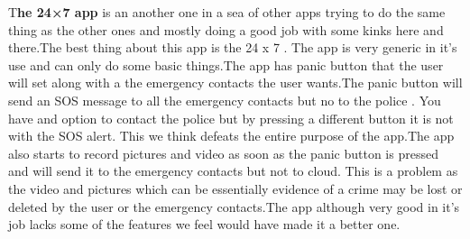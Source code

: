 \documentclass[	DIV=calc,%
							paper=a4,%
							fontsize=12pt,%
							twocolumn]{scrartcl}
\newcommand{\initial}[1]{%
     \lettrine[lines=3,lhang=0.3,nindent=0em]{
     				\color{DarkGoldenrod}
     				{\textsf{#1}}}{}}
\begin{document}
\newline\initial{T}\textbf{he 24×7 app} is an another one in a sea of other apps trying to do the same thing as the other ones and mostly doing a good job with some kinks here and there.The best thing about this app is the 24 x 7 . The app is very generic in it's use and can only do some basic things.The app has panic button that the user will set along with a the emergency contacts the user wants.The panic button will send an SOS message to all the emergency contacts but no to the police . You have and option to contact the police but by pressing a different button it is not with the SOS alert. This we think defeats the entire purpose of the app.The app also starts to record pictures and video as soon as the panic button is pressed and will send it to the emergency contacts but not to cloud. This is a problem as the video and pictures which can be essentially evidence of a crime may be lost or deleted by the user or the emergency contacts.The app although very good in it's job lacks some of the features we feel would have made it a better one.
\end{document}

